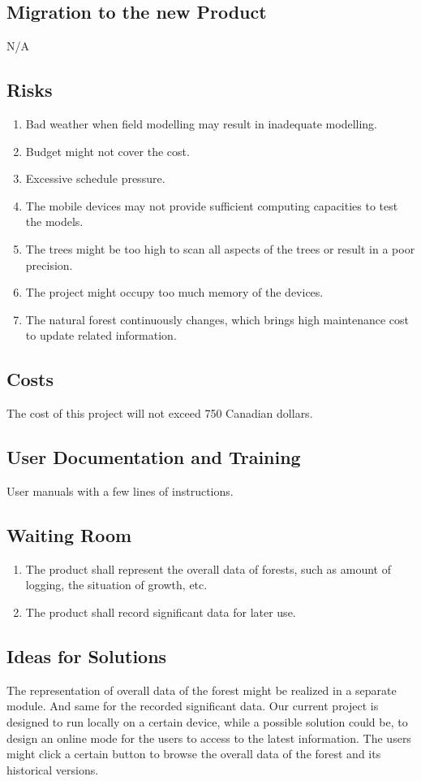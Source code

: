 \documentclass{article}
\begin{document}
\subsection{Migration to the new Product}
N/A
\subsection{Risks}
\begin{enumerate}
    \item Bad weather when field modelling may result in inadequate modelling.
    \item Budget might not cover the cost.
    \item Excessive schedule pressure.
    \item The mobile devices may not provide sufficient computing capacities to test the models.
    \item The trees might be too high to scan all aspects of the trees or result in a poor precision.
    \item The project might occupy too much memory of the devices.
    \item The natural forest continuously changes, which brings high maintenance cost to update related information. 
\end{enumerate}
\subsection{Costs}
The cost of this project will not exceed 750 Canadian dollars.
\subsection{User Documentation and Training}
User manuals with a few lines of instructions. 
\subsection{Waiting Room}
\begin{enumerate}
    \item The product shall represent the overall data of forests, such as amount of logging, the situation of growth, etc.
    \item The product shall record significant data for later use.
\end{enumerate}
\subsection{Ideas for Solutions}
The representation of overall data of the forest might be realized in a separate module. And same for the recorded significant data. Our current project is designed to run locally on a certain device, while a possible solution could be, to design an online mode for the users to access to the latest information. The users might click a certain button to browse the overall data of the forest and its historical versions. 

\end{document}

